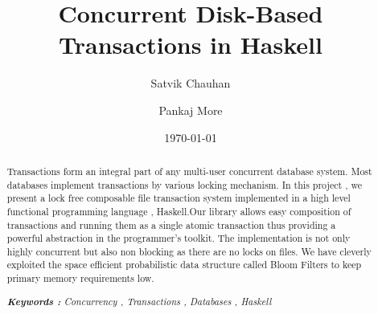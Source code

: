 \documentclass[11pt,a4paper]{article}
\title{ Concurrent Disk-Based Transactions in Haskell}
\author{Satvik Chauhan \and Pankaj More}
\date{{\small \today}}
\begin{document}
\maketitle
%
\begin{abstract}
Transactions form an integral part of any multi-user concurrent database system. Most databases implement transactions by various locking mechanism.
In this project , we present a lock free composable file transaction system implemented in a high level functional programming language , Haskell.Our library allows easy composition of transactions and running them as a single atomic transaction thus providing a powerful abstraction in the programmer's toolkit. The implementation is not only highly concurrent but also non blocking as there are no locks on files. We have cleverly exploited the space efficient probabilistic data structure called Bloom Filters to keep primary memory requirements low.


\em{\textbf{Keywords  :} Concurrency , Transactions , Databases , Haskell}

\end{abstract}
%
\end{document}
